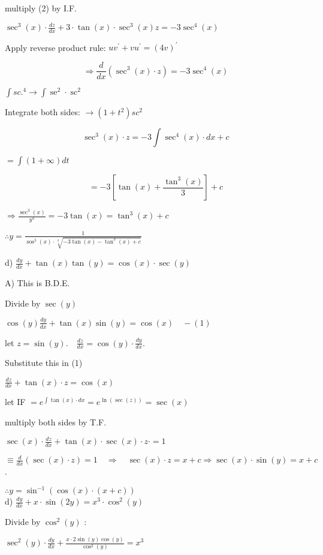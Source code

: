 \documentclass[12pt, a4paper]{article}
\begin{document}
multiply (2) by I.F.

$\sec ^{3}(x) \cdot \frac{d z}{d x}+3 \cdot \tan (x) \cdot \sec ^{3}(x) z=-3 \sec ^{4}(x)$

Apply reverse product rule: $u v^{\prime}+v u^{\prime}=(4 v)^{\prime}$

$$
\Rightarrow \frac{d}{d x}\left(\sec ^{3}(x) \cdot z\right)=-3 \sec ^{4}(x)
$$

$\int s c .^{4} \rightarrow \int \operatorname{se}^{2} \cdot \operatorname{sc}^{2}$

Integrate both sides: $\rightarrow\left(1+t^{2}\right) s c^{2}$


\begin{equation*}
\sec ^{3}(x) \cdot z=-3 \int \sec ^{4}(x) \cdot d x+c \tag{x}
\end{equation*}


$=\int(1+\infty) d t$

$$
=-3\left[\tan (x)+\frac{\tan ^{3}(x)}{3}\right]+c
$$

$\Rightarrow \frac{\sec ^{3}(x)}{y^{3}}=-3 \tan (x)=\tan ^{3}(x)+c$

$\therefore y=\frac{1}{\operatorname{sos}^{5}(x) \cdot \sqrt[3]{-3 \tan (x)-\tan ^{3}(x)+c}}$

d) $\frac{d y}{d x}+\tan (x) \tan (y)=\cos (x) \cdot \sec (y)$

A) This is B.D.E.

Divide by $\sec (y)$

$\cos (y) \frac{d y}{d x}+\tan (x) \sin (y)=\cos (x) \quad-(1)$

let $z=\sin (y) . \quad \frac{d z}{d x}=\cos (y) \cdot \frac{d y}{d x}$.

Substitute this in (1)

$\frac{d z}{d x}+\tan (x) \cdot z=\cos (x)$

let IF $=e^{\int \tan (x) \cdot d x}=e^{\ln (\sec (z))}=\sec (x)$

multiply both sides by T.F.

$\sec (x) \cdot \frac{d z}{d x}+\tan (x) \cdot \sec (x) \cdot z \cdot=1$

$\equiv \frac{d}{d x}(\sec (x) \cdot z)=1 \quad \Rightarrow \quad \sec (x) \cdot z=x+c \Rightarrow \sec (x) \cdot \sin (y)=x+c$.

$\therefore y=\sin ^{-1}(\cos (x) \cdot(x+c))$\\
d) $\frac{d y}{d x}+x \cdot \sin (2 y)=x^{3} \cdot \cos ^{2}(y)$

Divide by $\cos ^{2}(y)$ :

$\sec ^{2}(y) \cdot \frac{d y}{d x}+\frac{x \cdot 2 \sin (y) \cos (y)}{\cos ^{2}(y)}=x^{3}$
\end{document}

